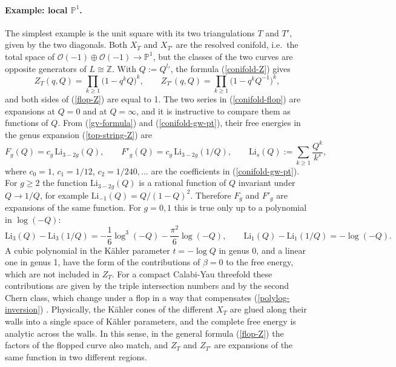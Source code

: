\documentclass[11pt]{article}
\newcommand{\Z}{\mathbb{Z}}
\newcommand{\PP}{\mathbb{P}}
\newcommand{\CO}{\mathcal{O}}
\begin{document}
\paragraph{Example: local $\PP^1$.} The simplest example is the unit square with its two
triangulations $T$ and $T'$, given by the two diagonals. Both $X_T$ and $X_{T'}$ are the resolved
conifold, i.e.\ the total space of $\CO(-1)\oplus\CO(-1)\rightarrow\PP^1$, but the classes of the two
curves are opposite generators of $L\cong\Z$. With $Q:=Q^{l_\tau}$, the formula
(\ref{conifold-Z}) gives
\begin{equation}\label{conifold-flop}
Z_T(q,Q)=\prod_{k\geq1}\big(1-q^kQ\big)^k,\qquad Z_{T'}(q,Q)=\prod_{k\geq1}\big(1-q^kQ^{-1}\big)^k,
\end{equation}
and both sides of (\ref{flop-Z}) are equal to 1. The two series in (\ref{conifold-flop}) are
expansions at $Q=0$ and at $Q=\infty$, and it is instructive to compare them as functions of $Q$.
From (\ref{gv-formula}) and (\ref{conifold-gw-pt}), their free energies in the genus expansion
(\ref{top-string-Z}) are
\begin{equation}\label{conifold-Fg}
F_g(Q)=c_g\,\mathrm{Li}_{3-2g}(Q),\qquad F'_g(Q)=c_g\,\mathrm{Li}_{3-2g}(1/Q),\qquad
\mathrm{Li}_s(Q):=\sum_{k\geq1}\frac{Q^k}{k^s},
\end{equation}
where $c_0=1$, $c_1=1/12$, $c_2=1/240,\ldots$ are the coefficients in (\ref{conifold-gw-pt}). For
$g\geq2$ the function $\mathrm{Li}_{3-2g}(Q)$ is a rational function of $Q$ invariant under
$Q\rightarrow1/Q$, for example $\mathrm{Li}_{-1}(Q)=Q/(1-Q)^2$. Therefore $F_g$ and $F'_g$ are
expansions of the same function. For $g=0,1$ this is true only up to a polynomial in $\log(-Q)$:
\begin{equation}\label{polylog-inversion}
\mathrm{Li}_3(Q)-\mathrm{Li}_3(1/Q)=-\frac16\log^3(-Q)-\frac{\pi^2}{6}\log(-Q),\qquad
\mathrm{Li}_1(Q)-\mathrm{Li}_1(1/Q)=-\log(-Q).
\end{equation}
A cubic polynomial in the K\"ahler parameter $t=-\log Q$ in genus 0, and a linear one in genus 1,
have the form of the contributions of $\beta=0$ to the free energy, which are not included in
$Z_T$. For a compact Calabi-Yau threefold these contributions are given by the triple
intersection numbers and by the second Chern class, which change under a flop in a way that
compensates (\ref{polylog-inversion}) \cite{Witten-phases,AGM}. Physically, the K\"ahler cones of
the different $X_T$ are glued along their walls into a single space of K\"ahler parameters, and
the complete free energy is analytic across the walls. In this sense, in the general formula
(\ref{flop-Z}) the factors of the flopped curve also match, and $Z_T$ and $Z_{T'}$ are
expansions of the same function in two different regions.
\end{document}
